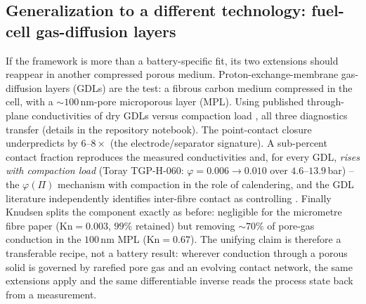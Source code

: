 \documentclass[10pt,a4paper]{article}
\begin{document}
\subsection{Generalization to a different technology: fuel-cell gas-diffusion layers}
\label{sec:results:gdl}
If the framework is more than a battery-specific fit, its two extensions should reappear in another compressed porous medium. Proton-exchange-membrane gas-diffusion layers (GDLs) are the test: a fibrous carbon medium compressed in the cell, with a $\sim100$\,nm-pore microporous layer (MPL). Using published through-plane conductivities of dry GDLs versus compaction load \cite{burheim2010}, all three diagnostics transfer (details in the repository notebook). The point-contact closure underpredicts by $6$--$8\times$ (the electrode/separator signature). A sub-percent contact fraction reproduces the measured conductivities and, for every GDL, \emph{rises with compaction load} (Toray TGP-H-060: $\varphi=0.006\to0.010$ over $4.6$--$13.9$\,bar) -- the $\varphi(\Pi)$ mechanism with compaction in the role of calendering, and the GDL literature independently identifies inter-fibre contact as controlling \cite{burheim2010}. Finally Knudsen splits the component exactly as before: negligible for the micrometre fibre paper ($\mathrm{Kn}=0.003$, $99\%$ retained) but removing $\sim70\%$ of pore-gas conduction in the $100$\,nm MPL ($\mathrm{Kn}=0.67$). The unifying claim is therefore a transferable recipe, not a battery result: wherever conduction through a porous solid is governed by rarefied pore gas and an evolving contact network, the same extensions apply and the same differentiable inverse reads the process state back from a measurement.
\end{document}
